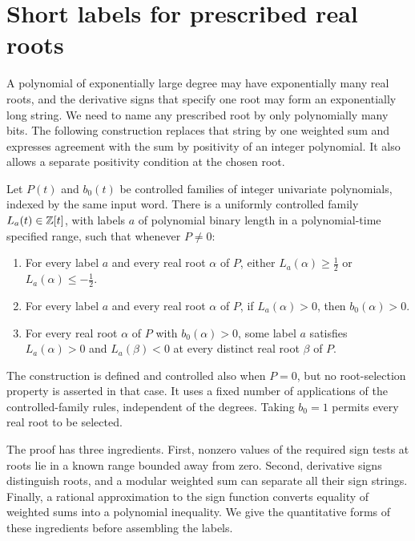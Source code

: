 \section{Short labels for prescribed real roots}\label{sec:labels}

A polynomial of exponentially large degree may have exponentially many
real roots, and the derivative signs that specify one root may form an
exponentially long string.  We need to name any prescribed root by only
polynomially many bits.  The following construction replaces that string
by one weighted sum and expresses agreement with the sum by positivity of
an integer polynomial.  It also allows a separate positivity condition at
the chosen root.

\begin{proposition}\label{prop:root-labels}
Let $P(t)$ and $b_0(t)$ be controlled families of integer univariate
polynomials, indexed by the same input word.  There is a uniformly
controlled family $L_a(t)\in\mathbb Z[t]$, with labels $a$ of polynomial binary
length in a polynomial-time specified range, such that whenever
$P\ne0$:
\begin{enumerate}
\item For every label $a$ and every real root $\alpha$ of $P$,
      either $L_a(\alpha)\ge\tfrac12$ or
      $L_a(\alpha)\le-\tfrac12$.
\item For every label $a$ and every real root $\alpha$ of $P$,
      if $L_a(\alpha)>0$, then $b_0(\alpha)>0$.
\item For every real root $\alpha$ of $P$ with $b_0(\alpha)>0$, some
      label $a$ satisfies $L_a(\alpha)>0$ and $L_a(\beta)<0$ at every
      distinct real root $\beta$ of $P$.
\end{enumerate}
The construction is defined and controlled also when $P=0$, but no
root-selection property is asserted in that case.  It uses a fixed
number of applications of the controlled-family rules, independent of
the degrees.  Taking $b_0=1$ permits every real root to be selected.
\end{proposition}

The proof has three ingredients.  First, nonzero values of the required
sign tests at roots lie in a known range bounded away from zero.  Second,
derivative signs distinguish roots, and a modular weighted sum can
separate all their sign strings.  Finally, a rational approximation to
the sign function converts equality of weighted sums into a polynomial
inequality.  We give the quantitative forms of these ingredients before
assembling the labels.

